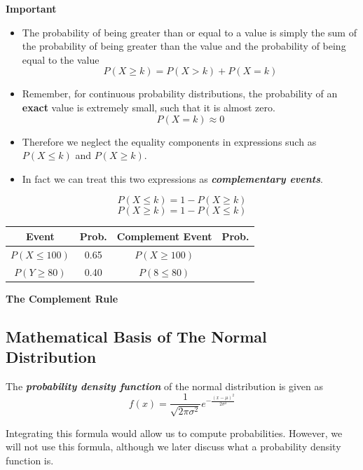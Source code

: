 \documentclass[]{report}
\begin{document}
	\begin{framed}
	\noindent \textbf{Important}
	\begin{itemize}
		
	
		\item The probability of being greater than or equal to a value is simply the sum of the probability of being greater than the value and the probability of being equal to the value
		\[  P(X \geq k)  = P( X > k) + P(X = k) \]
			\item Remember, for continuous probability distributions, the probability of an \textbf{exact} value is extremely small, such that it is almost zero.
				\[P(X = k) \approx 0\]
		\item Therefore we neglect the equality components in expressions such as
		$P(X \leq k)$ and $P(X \geq k)$.
		\item In fact we can treat this two expressions as \textbf{\textit{complementary events}}.
	\end{itemize}
	\end{framed}
	
	
	
	
	\[P(X \leq k) = 1- P(X \geq k) \]
	\[P(X \geq k) = 1- P(X \leq k) \]
	\begin{center}
	\begin{tabular}{|c|c|c|c|}
		\hline Event &\phantom{s} Prob.\phantom{s} & Complement Event & \phantom{s} Prob.\phantom{s}\\ 
		\hline $P(X \leq 100)$ & 0.65 &$P(X \geq 100)$  &  \\ 
		\hline $P(Y \geq 80)$ & 0.40 & $P(8 \leq 80)$ &  \\ 
		\hline 
	\end{tabular} 
	\end{center}


	\noindent \textbf{The Complement Rule}


	

	
	
	
	
	
	
	
	\subsection{Mathematical Basis of The Normal Distribution}
	The \textbf{\emph{probability density function}} of the normal distribution is given as
	\[ f(x) = \frac{1}{\sqrt{2\pi\sigma^2}} e^{ -\frac{(x-\mu)^2}{2\sigma^2} } \]
	
	Integrating this formula would allow us to compute probabilities.
	However, we will not use this formula, although we later discuss what a probability density function is.
	
\end{document}
